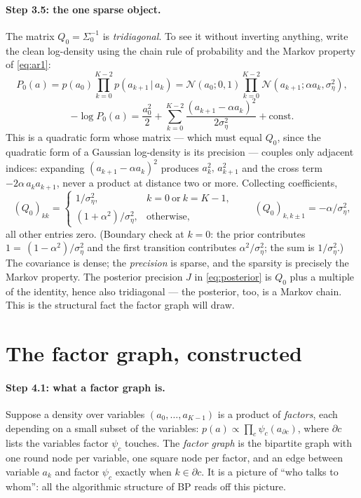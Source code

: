 \documentclass[11pt]{article}
\theoremstyle{definition}
\theoremstyle{remark}
\newcommand{\N}{\mathcal{N}}
\newcommand{\given}{\,|\,}
\begin{document}
\paragraph{Step 3.5: the one sparse object.}\label{step:Q0}
The matrix $Q_0=\Sigma_0^{-1}$ is \emph{tridiagonal}. To see it without
inverting anything, write the clean log-density using the chain rule of
probability and the Markov property of \eqref{eq:ar1}:
\[
  P_0(a)=p(a_0)\prod_{k=0}^{K-2}p(a_{k+1}\given a_k)
  =\N(a_0;0,1)\prod_{k=0}^{K-2}\N(a_{k+1};\alpha a_k,\sigma_\eta^2),
\]
\[
  -\log P_0(a)=\frac{a_0^2}{2}
  +\sum_{k=0}^{K-2}\frac{(a_{k+1}-\alpha a_k)^2}{2\sigma_\eta^2}
  +\text{const}.
\]
This is a quadratic form whose matrix --- which must equal $Q_0$, since the
quadratic form of a Gaussian log-density is its precision --- couples only
adjacent indices: expanding $(a_{k+1}-\alpha a_k)^2$ produces
$a_k^2,\,a_{k+1}^2$ and the cross term $-2\alpha\,a_ka_{k+1}$, never a
product at distance two or more. Collecting coefficients,
\begin{equation}\label{eq:Q0}
  (Q_0)_{kk}=
  \begin{cases}
    1/\sigma_\eta^2, & k=0\ \text{or}\ k=K{-}1,\\
    (1+\alpha^2)/\sigma_\eta^2, & \text{otherwise},
  \end{cases}
  \qquad
  (Q_0)_{k,k\pm1}=-\alpha/\sigma_\eta^2 ,
\end{equation}
all other entries zero. (Boundary check at $k=0$: the prior contributes
$1=\,(1-\alpha^2)/\sigma_\eta^2$ and the first transition contributes
$\alpha^2/\sigma_\eta^2$; the sum is $1/\sigma_\eta^2$.) The covariance is
dense; the \emph{precision} is sparse, and the sparsity is precisely the
Markov property. The posterior precision $J$ in \eqref{eq:posterior} is
$Q_0$ plus a multiple of the identity, hence also tridiagonal --- the
posterior, too, is a Markov chain. This is the structural fact the factor
graph will draw.

\section{The factor graph, constructed}\label{sec:fg}

\paragraph{Step 4.1: what a factor graph is.}
Suppose a density over variables $(a_0,\dots,a_{K-1})$ is a product of
\emph{factors}, each depending on a small subset of the variables:
$p(a)\propto\prod_c\psi_c(a_{\partial c})$, where $\partial c$ lists the
variables factor $\psi_c$ touches. The \emph{factor graph} is the bipartite
graph with one round node per variable, one square node per factor, and an
edge between variable $a_k$ and factor $\psi_c$ exactly when
$k\in\partial c$. It is a picture of ``who talks to whom'': all the
algorithmic structure of BP reads off this picture.
\end{document}
